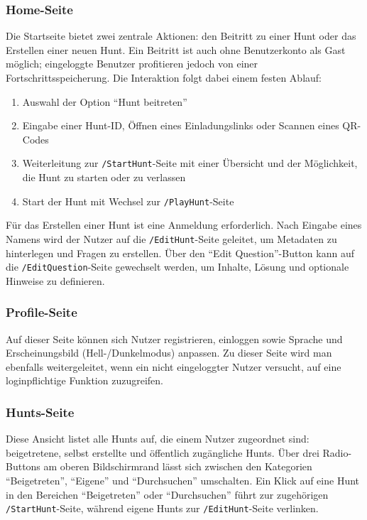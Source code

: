 \documentclass[oneside]{ausarbeitung}
\begin{document}
\subsubsection{Home-Seite}
Die Startseite bietet zwei zentrale Aktionen: den Beitritt zu einer Hunt oder das Erstellen einer neuen Hunt.  
Ein Beitritt ist auch ohne Benutzerkonto als Gast möglich; eingeloggte Benutzer profitieren jedoch von einer Fortschrittsspeicherung.  
Die Interaktion folgt dabei einem festen Ablauf:  
\begin{enumerate}
    \item Auswahl der Option \enquote{Hunt beitreten}  
    \item Eingabe einer Hunt-ID, Öffnen eines Einladungslinks oder Scannen eines QR-Codes  
    \item Weiterleitung zur \texttt{/StartHunt}-Seite mit einer Übersicht und der Möglichkeit, die Hunt zu starten oder zu verlassen  
    \item Start der Hunt mit Wechsel zur \texttt{/PlayHunt}-Seite
\end{enumerate}

Für das Erstellen einer Hunt ist eine Anmeldung erforderlich.  
Nach Eingabe eines Namens wird der Nutzer auf die \texttt{/EditHunt}-Seite geleitet, um Metadaten zu hinterlegen und Fragen zu erstellen.  
Über den \enquote{Edit Question}-Button kann auf die \texttt{/EditQuestion}-Seite gewechselt werden, um Inhalte, Lösung und optionale Hinweise zu definieren.

\subsubsection{Profile-Seite}
Auf dieser Seite können sich Nutzer registrieren, einloggen sowie Sprache und Erscheinungsbild (Hell-/Dunkelmodus) anpassen.  
Zu dieser Seite wird man ebenfalls weitergeleitet, wenn ein nicht eingeloggter Nutzer versucht, auf eine loginpflichtige Funktion zuzugreifen.

\subsubsection{Hunts-Seite}
Diese Ansicht listet alle Hunts auf, die einem Nutzer zugeordnet sind: beigetretene, selbst erstellte und öffentlich zugängliche Hunts.  
Über drei Radio-Buttons am oberen Bildschirmrand lässt sich zwischen den Kategorien \enquote{Beigetreten}, \enquote{Eigene} und \enquote{Durchsuchen} umschalten.  
Ein Klick auf eine Hunt in den Bereichen \enquote{Beigetreten} oder \enquote{Durchsuchen} führt zur zugehörigen \texttt{/StartHunt}-Seite, während eigene Hunts zur \texttt{/EditHunt}-Seite verlinken.
\end{document}
